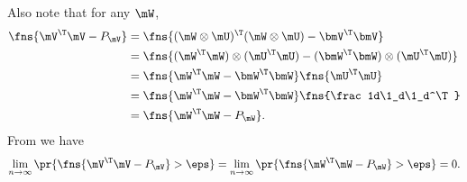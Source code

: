 \begin{proofof}{}
\begin{proofof}{}
Also note that for any $\mW$, \begin{equation}
\begin{split}
\fns{\mV^\T\mV-P_\mV}&=\fns{(\mW\otimes\mU)^\T(\mW\otimes\mU)-\bmV^\T\bmV}\\
&=\fns{(\mW^\T\mW)\otimes(\mU^\T\mU)-(\bmW^\T\bmW)\otimes(\mU^\T\mU)}\\
&=\fns{\mW^\T\mW-\bmW^\T\bmW}\fns{\mU^\T\mU}\\
&=\fns{\mW^\T\mW-\bmW^\T\bmW}\fns{\frac1d\1_d\1_d^\T}\\
&=\fns{\mW^\T\mW-P_\mW}.
\end{split}
\end{equation}
From  we have
\begin{equation}
    \lim_{n\to\infty}\pr{\fns{\mV^\T\mV-P_\mV}>\eps} = \lim_{n\to\infty}\pr{\fns{\mW^\T\mW-P_\mW}>\eps}= 0.
\end{equation}
\end{proofof}


\end{proofof}
